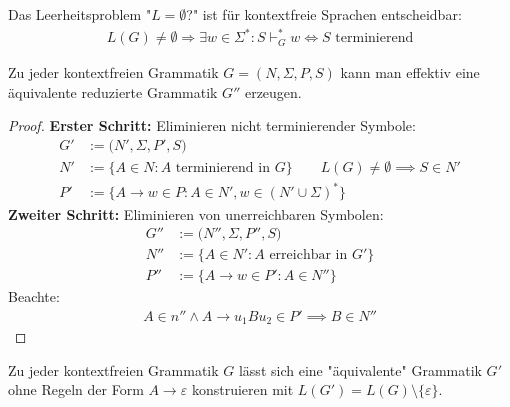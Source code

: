\begin{satz}\label{satz8.5}
	Das Leerheitsproblem "$L=\emptyset$?" ist für kontextfreie Sprachen entscheidbar:
	\begin{align*}
		L(G)\neq\emptyset\Longrightarrow\exists w\in\Sigma^\ast:S\vdash_G^\ast w
		\Longleftrightarrow S\text{ terminierend}
	\end{align*}
\end{satz}

\begin{lemma}\label{lemma8.6}
	Zu jeder kontextfreien Grammatik $G=(N,\Sigma,P,S)$ kann man effektiv eine äquivalente reduzierte Grammatik $G''$ erzeugen.
\end{lemma}

\begin{proof}
	\textbf{Erster Schritt:} Eliminieren nicht terminierender Symbole:
	\begin{align*}
		G'&:=\big(N',\Sigma,P',S\big)\\
		N'&:=\big\lbrace A\in N:A\text{ terminierend in }G\big\rbrace\qquad L(G)\neq\emptyset\implies S\in N'\\
		P'&:=\big\lbrace A\to w\in P:A\in N',w\in(N'\cup\Sigma)^\ast\big\rbrace
	\end{align*}
	\textbf{Zweiter Schritt:} Eliminieren von unerreichbaren Symbolen:
	\begin{align*}
		G''&:=\big(N'',\Sigma,P'',S\big)\\
		N''&:=\big\lbrace A\in N':A\text{ erreichbar in }G'\big\rbrace\\
		P''&:=\big\lbrace A\to w\in P':A\in N''\big\rbrace
	\end{align*}
	Beachte:
	\begin{align*}
		A\in n''\wedge A\to u_1 Bu_2\in P'\implies B\in N''
	\end{align*}
\end{proof}

\begin{lemma}\label{lemma8.7}
	Zu jeder kontextfreien Grammatik $G$ lässt sich eine "äquivalente" Grammatik $G'$ ohne Regeln der Form $A\to\varepsilon$ konstruieren mit $L(G')=L(G)\setminus\lbrace\varepsilon\rbrace$.
\end{lemma}

